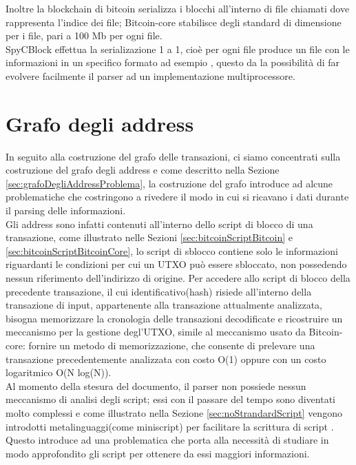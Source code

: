Inoltre la blockchain di bitcoin serializza i blocchi all'interno di file chiamati  dove  rappresenta l'indice dei file; Bitcoin-core stabilisce degli standard di dimensione per i file, pari a 100 Mb per ogni file.\\
SpyCBlock effettua la serializazione 1 a 1, cioè per ogni file  produce un file con le informazioni in un specifico formato ad esempio , questo da la possibilità di far evolvere facilmente il parser ad un implementazione multiprocessore.

\section{Grafo degli address} \label{sec:solGraphAddress}

In seguito alla costruzione del grafo delle transazioni, ci siamo concentrati sulla costruzione del grafo degli address e come descritto nella Sezione \ref{sec:grafoDegliAddressProblema}, la costruzione del grafo introduce ad alcune problematiche che costringono a rivedere il modo in cui si ricavano i dati durante il parsing delle informazioni.\\
Gli address sono infatti contenuti all'interno dello script di blocco di una transazione, come illustrato nelle Sezioni \ref{sec:bitcoinScriptBitcoin} e \ref{sec:bitcoinScriptBitcoinCore}, lo script di sblocco contiene solo le informazioni riguardanti le condizioni per cui un UTXO può essere sbloccato, non possedendo nessun riferimento dell'indirizzo di origine.
Per accedere allo script di blocco della precedente transazione, il cui identificativo(hash) risiede all'interno della transazione di input, appartenente alla transazione attualmente analizzata, bisogna memorizzare la cronologia delle transazioni decodificate e ricostruire un meccanismo per la gestione degl'UTXO, simile al meccanismo usato da Bitcoin-core: fornire un metodo di memorizzazione, che consente di prelevare una transazione precedentemente analizzata con costo O(1) oppure con un costo logaritmico O(N log(N)).\\
Al momento della stesura del documento, il parser non possiede nessun meccanismo di analisi degli script; essi con il passare del tempo sono diventati molto complessi e come illustrato nella Sezione \ref{sec:noStrandardScript} vengono introdotti metalinguaggi(come miniscript) per facilitare la scrittura di script . Questo introduce ad una problematica che porta alla necessità di studiare in modo approfondito gli script per ottenere da essi maggiori informazioni.
